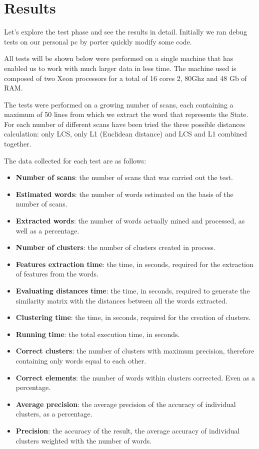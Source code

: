 \section{Results}

Let's explore the test phase and see the results in detail. Initially we ran debug tests on our personal pc by porter quickly modify some code.

All tests will be shown below were performed on a single machine that has enabled us to work with much larger data in less time. The machine used is composed of two Xeon processors for a total of 16 cores \@ 2, 80Ghz and 48 Gb of RAM.

The tests were performed on a growing number of scans, each containing a maximum of 50 lines from which we extract the word that represents the State. For each number of different scans have been tried the three possible distances calculation: only LCS, only L1 (Euclidean distance) and LCS and L1 combined together.

The data collected for each test are as follows:
\begin{itemize}
\item \textbf{Number of scans}: the number of scans that was carried out the test.
\item \textbf{Estimated words}: the number of words estimated on the basis of the number of scans.
\item\textbf{Extracted words}: the number of words actually mined and processed, as well as a percentage.
\item \textbf{Number of clusters}: the number of clusters created in process.
\item \textbf{Features extraction time}: the time, in seconds, required for the extraction of features from the words.
\item \textbf{Evaluating distances time}: the time, in seconds, required to generate the similarity matrix with the distances between all the words extracted.
\item \textbf{Clustering time}: the time, in seconds, required for the creation of clusters.
\item \textbf{Running time}: the total execution time, in seconds.
\item \textbf{Correct clusters}: the number of clusters with maximum precision, therefore containing only words equal to each other.
\item \textbf{Correct elements}: the number of words within clusters corrected. Even as a percentage.
\item \textbf{Average precision}: the average precision of the accuracy of individual clusters, as a percentage.
\item \textbf{Precision}: the accuracy of the result, the average accuracy of individual clusters weighted with the number of words.
\end{itemize}

